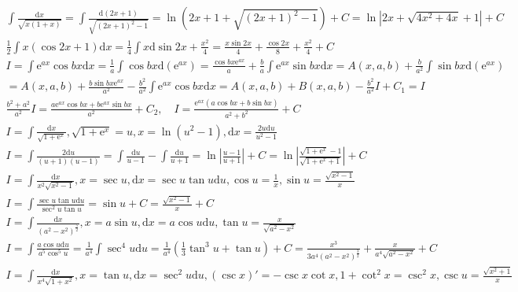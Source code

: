 \documentclass{article}
\begin{document}
\clearpage 

\begin{align*}
    \int \frac{\mathrm{d}x}{\sqrt{x(1+x)}} = \int \frac{\mathrm{d}(2x+1)}{\sqrt{\left(2x+1\right)^2-1}} = \ln(2x+1+\sqrt{(2x+1)^2 - 1}) + C = \ln |2x+\sqrt{4x^2+4x}+1| + C \\
    \frac{1}{2} \int x(\cos 2x + 1)\mathrm{d}x = \frac{1}{4} \int x \mathrm{d}\sin 2x + \frac{x^2}{4} = \frac{x\sin 2x}{4} + \frac{\cos 2x}{8} + \frac{x^2}{4} + C \\
    I = \int \mathrm{e}^{ax} \cos bx \mathrm{d}x = \frac{1}{a} \int\cos bx \mathrm{d}(\mathrm{e}^{ax}) = \frac{\cos bx \mathrm{e}^{ax}}{a} + \frac{b}{a}\int \mathrm{e}^{ax}\sin bx \mathrm{d}x = A(x,a,b) + \frac{b}{a^2} \int \sin bx \mathrm{d}(\mathrm{e}^{ax})\\
    = A(x,a,b) + \frac{b\sin bx \mathrm{e}^{ax}}{a^2} - \frac{b^2}{a^2}\int \mathrm{e}^{ax}\cos bx \mathrm{d}x = A(x,a,b) + B(x,a,b) - \frac{b^2}{a^2}I + C_{1} = I \\ 
    \frac{b^2+a^2}{a^2} I = \frac{a \mathrm{e}^{ax} \cos bx + b \mathrm{e}^{ax}\sin bx}{a^2} + C_{2} , \quad I = \frac{\mathrm{e}^{ax}(a\cos bx + b\sin bx)}{a^2+b^2} + C\\
    I = \int \frac{\mathrm{d}x}{\sqrt{1+\mathrm{e}^{x}}} , \sqrt{1+\mathrm{e}^{x}} = u , x = \ln(u^2-1) , \mathrm{d}x = \frac{2u\mathrm{d}u}{u^2-1} \\
    I = \int \frac{2\mathrm{d}u}{(u+1)(u-1)} = \int \frac{\mathrm{d}u}{u-1} - \int \frac{\mathrm{d}u}{u+1} = \ln\left| \frac{u-1}{u+1} \right| + C  = \ln \left| \frac{\sqrt{1+\mathrm{e}^{x}}-1}{\sqrt{1+\mathrm{e}^{x}+1}} \right| + C\\
    I = \int \frac{\mathrm{d}x}{x^2\sqrt{x^2-1}} , x = \sec u , \mathrm{d}x = \sec u \tan u \mathrm{d}u , \cos u = \frac{1}{x} , \sin u = \frac{\sqrt{x^2-1}}{x}\\
    I = \int \frac{\sec u \tan u \mathrm{d}u}{\sec^2 u \tan u} = \sin u + C = \frac{\sqrt{x^2-1}}{x} + C \\ 
    I = \int \frac{\mathrm{d}x}{(a^2-x^2)^{\frac{5}{2}}} , x = a\sin u , \mathrm{d}x = a\cos u \mathrm{d}u , \tan u = \frac{x}{\sqrt{a^2-x^2}}\\
    I = \int \frac{a\cos u\mathrm{d}u}{a^5\cos^5 u} = \frac{1}{a^4} \int \sec^4 u \mathrm{d}u = \frac{1}{a^4}\left(\frac{1}{3}\tan^3 u + \tan u\right) + C = \frac{x^3}{3a^4(a^2-x^2)^{\frac{3}{2}}} + \frac{x}{a^4\sqrt{a^2-x^2}} + C \\
    I = \int \frac{\mathrm{d}x}{x^4\sqrt{1+x^2}} , x = \tan u , \mathrm{d} x = \sec^2 u \mathrm{d} u ,(\csc x)' = -\csc x \cot x , 1 + \cot^2 x = \csc^2 x , \csc u = \frac{\sqrt{x^2+1}}{x}\\

\end{align*}
\end{document}
